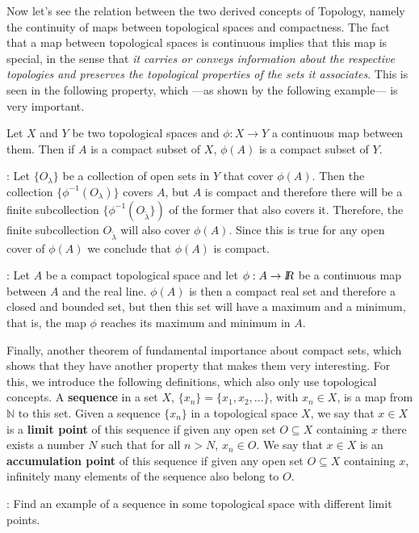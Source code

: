 Now let's see the relation between the two derived concepts of
Topology, namely the continuity of maps between topological
spaces and compactness. The fact that a map between
topological spaces is continuous implies that this map is special,
in the sense that {\it it carries or conveys information about the respective
topologies and preserves the topological properties of the sets
it associates}. This is seen in the following property, which ---as shown by
the following example--- is very important.

\bteo
Let $X$ and $Y$ be two topological spaces and $\phi: X \to Y$ a continuous
map between them. Then if $A$ is a compact subset of $X$, 
$\phi(A)$ is a compact subset of $Y$.
\eteo

\pru:
Let $\{O_{\lambda}\}$ be a collection of open sets in $Y$ that cover $\phi(A)$.
Then the collection $\{\phi^{-1}(O_{\lambda})\}$ covers $A$, but $A$ is
compact and therefore there will be a finite subcollection 
$\{\phi^{-1}(O_{\tilde{\lambda}}\})$
of the former that also covers it. Therefore, the finite subcollection
$O_{\tilde{\lambda}}$ will also cover $\phi(A)$. Since this is
true for any open cover of $\phi(A)$
we conclude that $\phi(A)$ is compact.

\ejem: Let $A$ be a compact topological space and let $\phi:A \to \mbox{\sl {l$\!\!\!\;\:\!$R}}$ be a continuous map between $A$ and the real line. $\phi(A)$ is then a compact real set
and therefore a closed and bounded set, but
then this set will have a maximum and a minimum, that is, the
map $\phi$ reaches its maximum and minimum in $A$.


Finally, another theorem of fundamental importance about compact sets,
which shows that they have another property that makes them
very interesting. For this, we introduce the following definitions,
which also only use topological concepts.
A {\bf sequence} in a set $X$, 
$\{x_n\} = \{x_1, x_2, ...\}$, with $x_n \in X$, is a map
from $\mathbb{N}$ to this set.
Given a sequence $\{x_n\}$ in a topological space $X$, we say that 
$x \in X$ is a {\bf limit point} of this sequence if given
any open set $O \subseteq X$ containing $x$ there exists a number $N$
such that for all $n > N$, $x_n \in O$. We say that 
$x \in X$ is an {\bf accumulation point} of this sequence if given 
any open set $O \subseteq X$ containing $x$, infinitely many elements of the
sequence also belong to $O$. 

\espa

\ejer: Find an example of a sequence in some topological
space with different limit points. 


